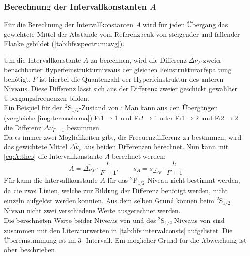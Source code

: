 \subsubsection*{Berechnung der Intervallkonstanten $A$}
Für die Berechnung der Intervallkonstanten $A$ wird für jeden Übergang das gewichtete Mittel der Abstände vom Referenzpeak 
von steigender und fallender Flanke gebildet (\autoref{tab:hfs:spectrum:avg}).

Um die Intervallkonstante $A$ zu berechnen, wird die Differenz $\Delta \nu_F$ zweier benachbarter Hyperfeinstrukturniveaus der 
gleichen Feinstrukturaufspaltung benötigt. $F$ ist hierbei die Quantenzahl der Hyperfeinstruktur des unteren Niveaus. 
Diese Differenz lässt sich aus der Differenz zweier geschickt gewählter Übergangsfrequenzen bilden. \\
Ein Beispiel für den ${}^2\text{S}_{1/2}$-Zustand von : Man kann aus den Übergängen (vergleiche \autoref{img:termschema}) 
F:1$\to$1 und F:2$\to$1 oder F:1$\to$2 und F:2$\to$2 die Differenz $\Delta \nu_{F=1}$ bestimmen. \\
Da es immer zwei Möglichkeiten gibt, die Frequenzdifferenz zu bestimmen, wird das gewichtete Mittel $\overline{\Delta \nu_F}$ aus beiden Differenzen berechnet. Nun kann mit 
\autoref{eq:A:theo} die Intervallkonstante $A$ berechnet werden:
\begin{equation}
    A = \overline{\Delta \nu_F} \cdot \frac{h}{F + 1}, \qquad s_A = s_{\overline{\Delta \nu_F}} \cdot \frac{h}{F + 1}
\end{equation}
Für  kann die Intervallkonstante $A$ für das ${}^2\text{P}_{1/2}$ Niveau nicht bestimmt werden, da die zwei Linien, welche zur 
Bildung der Differenz benötigt werden, nicht einzeln aufgelöst werden konnten. Aus dem selben Grund können beim ${}^2\text{S}_{1/2}$ Niveau nicht 
zwei verschiedene Werte ausgerechnet werden.\\
Die berechneten Werte beider Niveaus von  und des ${}^2\text{S}_{1/2}$ Niveaus von  sind zusammen mit den 
Literaturwerten \cite{manual} in \autoref{tab:hfs:intervalconsts} aufgelistet. 
Die Übereinstimmung ist im 3-\textsigma-Intervall. Ein möglicher Grund für die Abweichung ist oben beschrieben.
